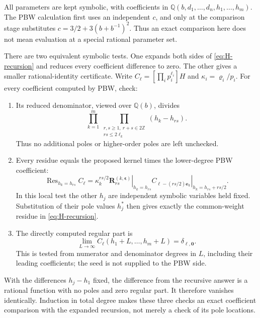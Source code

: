 \documentclass[11pt]{article}
\numberwithin{equation}{section}
\newcommand{\ve}{\boldsymbol\epsilon}
\DeclareMathOperator*{\Res}{Res}
\begin{document}
All parameters are kept symbolic, with coefficients in
$\mathbb Q(b,d_1,\ldots,d_n,h_1,\ldots,h_m)$. The PBW calculation first
uses an independent $c$, and only at the comparison stage substitutes
$c=3/2+3(b+b^{-1})^2$. Thus an exact comparison here does not mean
evaluation at a special rational parameter set.

There are two equivalent symbolic tests. One expands both sides of
\eqref{eq:H-recursion} and reduces every coefficient difference to zero.
The other gives a smaller rational-identity certificate. Write
$C_{\boldsymbol\ell}=[\prod_i p_i^{\ell_i}]H$ and
$\kappa_i=\varrho_i/p_i$. For every coefficient computed by PBW, check:
\begin{enumerate}
\item Its reduced denominator, viewed over $\mathbb Q(b)$, divides
\begin{equation}
 \prod_{k=1}^m\prod_{\substack{r,s\geq1,\ r+s\in2\mathbb Z\\rs\leq2\ell_k}}
      (h_k-h_{rs}).
 \label{eq:audit-pole-catalog}
\end{equation}
Thus no additional poles or higher-order poles are left unchecked.
\item Every residue equals the proposed kernel times the lower-degree
PBW coefficient:
\begin{equation}
 \Res_{h_k=h_{rs}} C_{\boldsymbol\ell}
 =\kappa_k^{rs/2}
    \left.\mathbf R^{(k,\ve)}_{rs}\right|_{h_k=h_{rs}}
    \left.C_{\boldsymbol\ell-(rs/2)\boldsymbol e_k}
                    \right|_{h_k=h_{rs}+rs/2}.
 \label{eq:audit-residue-identity}
\end{equation}
In this local test the other $h_j$ are independent symbolic variables
held fixed. Substitution of their pole values $h_j^*$ then gives exactly
the common-weight residue in \eqref{eq:H-recursion}.
\item The directly computed regular part is
\begin{equation}
 \lim_{L\to\infty}C_{\boldsymbol\ell}(h_1+L,\ldots,h_m+L)
 =\delta_{\boldsymbol\ell,\boldsymbol0}.
 \label{eq:audit-regular-part}
\end{equation}
This is tested from numerator and denominator degrees in $L$, including
their leading coefficients; the seed is not supplied to the PBW side.
\end{enumerate}
With the differences $h_j-h_1$ fixed, the difference from the recursive
answer is a rational function with no poles and zero regular part.
It therefore vanishes identically. Induction in total degree makes these
three checks an exact coefficient comparison with the expanded recursion,
not merely a check of its pole locations.
\end{document}
